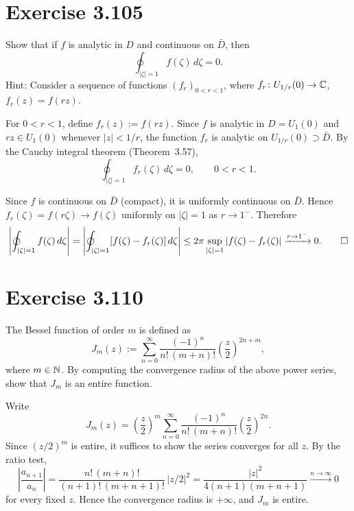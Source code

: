 \documentclass{article}
\begin{document}
\section{Exercise 3.105}

Show that if $f$ is analytic in $D$ and continuous on $\bar{D}$, then
\[
  \oint_{|\zeta|=1} f(\zeta)\,d\zeta = 0.
\]
Hint: Consider a sequence of functions $(f_r)_{0<r<1}$,
where $f_r \colon U_{1/r}(0) \to \mathbb{C}$,
$f_r(z) = f(rz)$.

\begin{solution}
  For $0 < r < 1$, define $f_r(z) := f(rz)$.
  Since $f$ is analytic in $D = U_1(0)$ and $rz \in U_1(0)$
  whenever $|z| < 1/r$, the function $f_r$ is analytic on
  $U_{1/r}(0) \supset \bar{D}$.
  By the Cauchy integral theorem (Theorem~3.57),
  \[
    \oint_{|\zeta|=1} f_r(\zeta)\,d\zeta = 0,
    \qquad 0 < r < 1.
  \]

  Since $f$ is continuous on $\bar{D}$ (compact), it is uniformly
  continuous on $\bar{D}$.
  Hence $f_r(\zeta) = f(r\zeta) \to f(\zeta)$ uniformly on
  $|\zeta| = 1$ as $r \to 1^-$.
  Therefore
  \[
    \left|\oint_{|\zeta|=1} f(\zeta)\,d\zeta\right|
    = \left|\oint_{|\zeta|=1} [f(\zeta) - f_r(\zeta)]\,d\zeta\right|
    \le 2\pi\sup_{|\zeta|=1}|f(\zeta) - f_r(\zeta)|
    \xrightarrow{r\to 1^-}0.\qedhere
  \]
\end{solution}

\section{Exercise 3.110}

The Bessel function of order $m$ is defined as
\[
  J_m(z) := \sum_{n=0}^{\infty}
  \frac{(-1)^n}{n!\,(m+n)!}
  \left(\frac{z}{2}\right)^{2n+m},
\]
where $m \in \mathbb{N}$.
By computing the convergence radius of the above
power series, show that $J_m$ is an entire function.

\begin{solution}
  Write
  \[
    J_m(z) = \left(\frac{z}{2}\right)^{\!m}
    \sum_{n=0}^{\infty}
    \frac{(-1)^n}{n!\,(m+n)!}\left(\frac{z}{2}\right)^{\!2n}.
  \]
  Since $(z/2)^m$ is entire, it suffices to show the series
  converges for all $z$.
  By the ratio test,
  \[
    \left|\frac{a_{n+1}}{a_n}\right|
    = \frac{n!\,(m+n)!}{(n+1)!\,(m+n+1)!}\,|z/2|^2
    = \frac{|z|^2}{4(n+1)(m+n+1)}
    \xrightarrow{n\to\infty}0
  \]
  for every fixed $z$.
  Hence the convergence radius is $+\infty$, and $J_m$ is entire.\qedhere
\end{solution}
\end{document}
